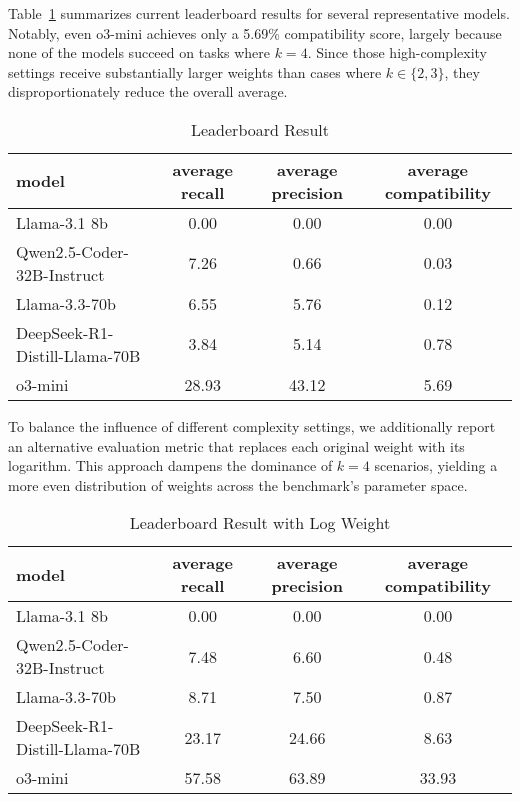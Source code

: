 Table~\ref{tab:leaderboard} summarizes current leaderboard results for several representative models. Notably, even o3-mini achieves only a 
5.69\% compatibility score, largely because none of the models succeed on tasks where $k=4$. Since those high-complexity settings receive substantially larger weights than cases where $k\in\{2, 3\}$, they disproportionately reduce the overall average.

\begin{table}[!ht]
    \centering
    \begin{tabular}{lccc}
    \toprule
    model & average recall & average precision & average compatibility \\
    \midrule
    Llama-3.1 8b & 0.00&	0.00&	0.00\\
    Qwen2.5-Coder-32B-Instruct	&7.26	&0.66	&0.03\\
    Llama-3.3-70b	&6.55	&5.76&	0.12\\
    DeepSeek-R1-Distill-Llama-70B	&3.84	&5.14	&0.78\\
    o3-mini	&28.93	&43.12	&5.69\\
    \bottomrule
    \end{tabular}
    \caption{Leaderboard Result}
    \label{tab:leaderboard}
\end{table}

To balance the influence of different complexity settings, we additionally report an alternative evaluation metric that replaces each original weight with its logarithm. This approach dampens the dominance of $k=4$ scenarios, yielding a more even distribution of weights across the benchmark’s parameter space.

\begin{table}[!ht]
    \centering
    \begin{tabular}{lccc}
    \toprule
    model & average recall & average precision & average compatibility \\
    \midrule
    Llama-3.1 8b&	0.00	&0.00	&0.00\\
    Qwen2.5-Coder-32B-Instruct	&7.48	&6.60	&0.48\\
    Llama-3.3-70b	&8.71	&7.50	&0.87\\
    DeepSeek-R1-Distill-Llama-70B	&23.17&	24.66&	8.63\\
    o3-mini	&57.58	&63.89&33.93\\
    \bottomrule
    \end{tabular}
    \caption{Leaderboard Result with Log Weight}
    \label{tab:leaderboard_log}
\end{table}


